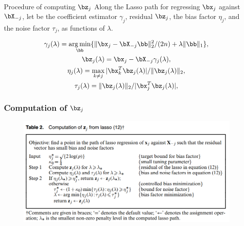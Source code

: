 \begin{frame}
\begin{block}{Procedure of computing $\bz_{j}$}
    Along the Lasso path for regressing $\bx_j$ against $\bX_{-j}$, let
    be the coefficient estimator $\gamma_j$, residual $\bz_j$, the bias factor $\eta_j$, and
    the noise factor $\tau_j$, as functions of $\lambda$.
\end{block}
\begin{gather}
    \gamma_j(\lambda) = \mathop{\arg\min}_{\bb} \{\|\bx_j -\bX_{-j}\bb\|_2^2/(2n) + \lambda\|\bb\|_1\}, \notag \\
    \bz_j(\lambda)   = \bx_j-\bX_{-j}\gamma_j(\lambda), \notag \\
    \eta_j(\lambda) = \max_{k\neq j}  |\bx_k^T\bz_j(\lambda)|/\|\bz_j(\lambda)\|_2, \notag \\
    \tau_j(\lambda)  =  \|\bz_j(\lambda)\|_2/|\bx_j^T\bz_j(\lambda)|, 
\end{gather}
\end{frame}

\begin{frame}
\frametitle{Computation of $\bz_{j}$}
\begin{figure}[h]
  \centering
  \includegraphics[width=1.0\textwidth]{./figs/Table2.png}
  \label{Table2}
\end{figure}
\end{frame}

